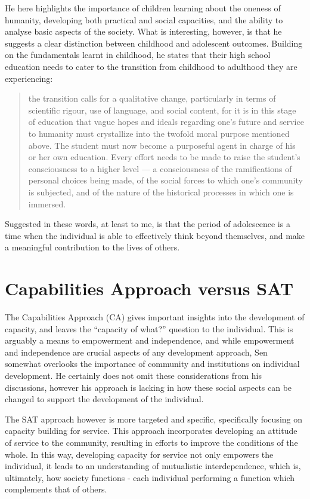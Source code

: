 He here highlights the importance of children learning about the oneness of humanity, developing both practical and social capacities, and the ability to analyse basic aspects of the society. What is interesting, however, is that he suggests a clear distinction between childhood and adolescent outcomes. Building on the fundamentals learnt in childhood, he states that their high school education needs to cater to the transition from childhood to adulthood they are experiencing:
\begin{quote}
	the transition calls for a qualitative change, particularly in terms of scientific rigour, use of language, and social content, for it is in this stage of education that vague hopes and ideals regarding one's future and service to humanity must crystallize into the twofold moral purpose mentioned above. The student must now become a purposeful agent in charge of his or her own education. Every effort needs to be made to raise the student's consciousness to a higher level — a consciousness of the ramifications of personal choices being made, of the social forces to which one's community is subjected, and of the nature of the historical processes in which one is immersed.
\end{quote}
Suggested in these words, at least to me, is that the period of adolescence is a time when the individual is able to effectively think beyond themselves, and make a meaningful contribution to the lives of others. 


\section{Capabilities Approach versus SAT}

The Capabilities Approach (CA) gives important insights into the development of capacity, and leaves the “capacity of what?” question to the individual. This is arguably a means to empowerment and independence, and while empowerment and independence are crucial aspects of any development approach, Sen somewhat overlooks the importance of community and institutions on individual development. He certainly does not omit these considerations from his discussions, however his approach is lacking in how these social aspects can be changed to support the development of the individual. 

The SAT approach however is more targeted and specific, specifically focusing on capacity building for service. This approach incorporates developing an attitude of service to the community, resulting in efforts to improve the conditions of the whole. In this way, developing capacity for service not only empowers the individual, it leads to an understanding of mutualistic interdependence, which is, ultimately, how society functions - each individual performing a function which complements that of others. 

